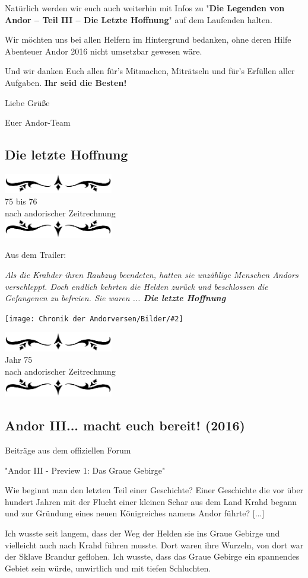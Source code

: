 \documentclass[10pt, a4paper, oneside]{book}
\newcommand{\fillbreak}{\vspace*{\fill}\columnbreak}
\newcommand{\storytext}[1]{%
    \section{#1}%
    \label{Storytext: #1}%
}
\newcommand{\bildmitts}[2][height=0.32\textwidth,width=0.48\textwidth,keepaspectratio]{%
    \begin{center}
        \texttt{[image: Chronik der Andorversen/Bilder/\#2]}
    \end{center}
}
\newcommand{\az}[1]{%
    \begin{center}
        \includegraphics[width=180px]{Chronik der Andorversen/verzierung1.png}\\
        {\Huge #1} \\
        {nach andorischer Zeitrechnung}\\
        \includegraphics[width=180px]{Chronik der Andorversen/verzierung2.png}
    \end{center}
    \extramarks{}{#1 a.Z.}
}
\begin{document}
\begin{multicols}{2}
Natürlich werden wir euch auch weiterhin mit Infos zu "\textbf{Die Legenden von Andor – Teil III – Die Letzte Hoffnung}" auf dem Laufenden halten.

Wir möchten uns bei allen Helfern im Hintergrund bedanken, ohne deren Hilfe Abenteuer Andor 2016 nicht umsetzbar gewesen wäre.

Und wir danken Euch allen für’s Mitmachen, Miträtseln und für’s Erfüllen aller Aufgaben. \textbf{Ihr seid die Besten!}

 

Liebe Grüße

Euer Andor-Team





\begin{chapterbox}

    \chapter{Die letzte Hoffnung}

    \az{75 bis 76}


    \begin{center}
        Aus dem Trailer:
    \end{center}

    \textit{Als die Krahder ihren Raubzug beendeten, hatten sie unzählige Menschen Andors verschleppt. Doch endlich kehrten die Helden zurück und beschlossen die Gefangenen zu befreien. Sie waren ... \textbf{Die letzte Hoffnung}}

    \bildmitts[width=\textwidth]{Die letzte Hoffnung GG.jpg}
 
\end{chapterbox}


\fillbreak
\az{Jahr 75}
\storytext{Andor III... macht euch bereit! (2016)}

\begin{center}
    Beiträge aus dem offiziellen Forum

    "Andor III - Preview 1: Das Graue Gebirge"
\end{center}

Wie beginnt man den letzten Teil einer Geschichte? Einer Geschichte die vor über hundert Jahren mit der Flucht einer kleinen Schar aus dem Land Krahd begann und zur Gründung eines neuen Königreiches namens Andor führte? [...]

Ich wusste seit langem, dass der Weg der Helden sie ins Graue Gebirge und vielleicht auch nach Krahd führen musste. Dort waren ihre Wurzeln, von dort war der Sklave Brandur geflohen. Ich wusste, dass das Graue Gebirge ein spannendes Gebiet sein würde, unwirtlich und mit tiefen Schluchten.


\end{multicols}
\end{document}
